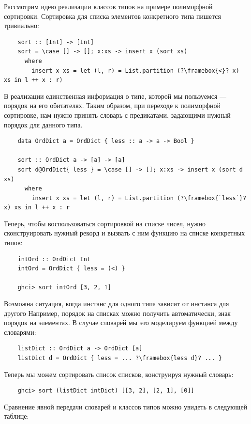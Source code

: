Рассмотрим идею реализации классов типов на примере полиморфной сортировки.
Сортировка для списка элементов конкретного типа пишется тривиально:
\begin{verbatim}
    sort :: [Int] -> [Int]
    sort = \case [] -> []; x:xs -> insert x (sort xs)
      where
        insert x xs = let (l, r) = List.partition (?\framebox{<}? x) xs in l ++ x : r)
\end{verbatim}

В реализации единственная информация о типе, которой мы пользуемся --- порядок на его обитателях.
Таким образом, при переходе к полиморфной сортировке, нам нужно принять словарь с предикатами, задающими нужный порядок для данного типа.
\begin{verbatim}
    data OrdDict a = OrdDict { less :: a -> a -> Bool }

    sort :: OrdDict a -> [a] -> [a]
    sort d@OrdDict{ less } = \case [] -> []; x:xs -> insert x (sort d xs)
      where
        insert x xs = let (l, r) = List.partition (?\framebox{`less`}? x) xs in l ++ x : r
\end{verbatim}

Теперь, чтобы воспользоваться сортировкой на списке чисел, нужно сконструировать нужный рекорд и вызвать с ним функцию на списке конкретных типов:
\begin{verbatim}
    intOrd :: OrdDict Int
    intOrd = OrdDict { less = (<) }

    ghci> sort intOrd [3, 2, 1]
\end{verbatim}

Возможна ситуация, когда инстанс для одного типа зависит от инстанса для другого
Например, порядок на списках можно получить автоматически, зная порядок на элементах.
В случае словарей мы это моделируем функцией между словарями:
\begin{verbatim}
    listDict :: OrdDict a -> OrdDict [a]
    listDict d = OrdDict { less = ... ?\framebox{less d}? ... }
\end{verbatim}

Теперь мы можем сортировать список списков, конструируя нужный словарь:
\begin{verbatim}
    ghci> sort (listDict intDict) [[3, 2], [2, 1], [0]]
\end{verbatim}

Сравнение явной передачи словарей и классов типов можно увидеть в следующей таблице:

